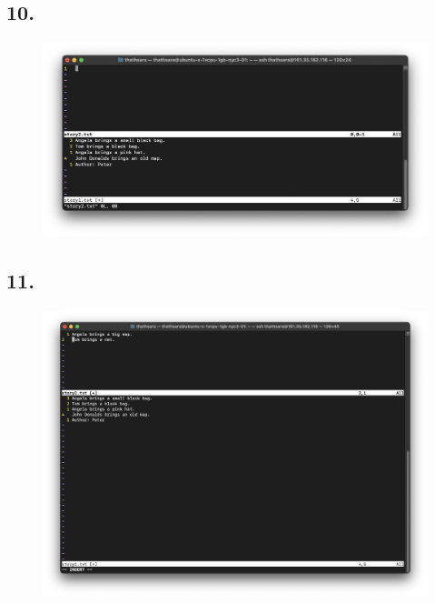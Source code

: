 \documentclass{article}
\begin{document}
    \subsection*{10.}
    \begin{figure}[H]
        \centering
        \includegraphics[width=\textwidth]{2/10.png}
    \end{figure}

    \subsection*{11.}
    \begin{figure}[H]
        \centering
        \includegraphics[width=\textwidth]{2/11.png}
    \end{figure}
\end{document}
